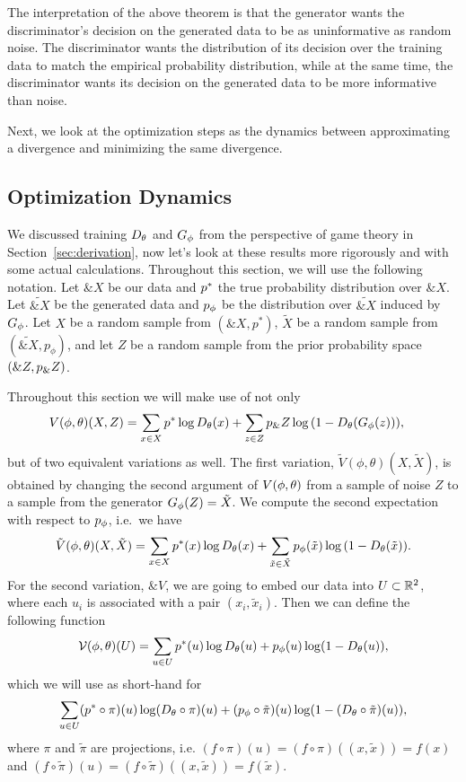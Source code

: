 The interpretation of the above theorem is that the generator wants
the discriminator's decision on the generated data to be as
uninformative as random noise.  The discriminator wants the
distribution of its decision over the training data to match the
empirical probability distribution, while at the same time, the
discriminator wants its decision on the generated data to be more
informative than noise.

Next, we look at the optimization steps as the dynamics between
approximating a divergence and minimizing the same divergence.

\subsection{Optimization Dynamics}%
\label{sec:optimization-dynamics}

We discussed training $D_\theta$ and $G_\phi$ from the perspective of game
theory in Section~\ref{sec:derivation}, now let's look at these
results more rigorously and with some actual calculations. Throughout
this section, we will use the following notation. Let $\&X$ be our
data and $p^*$ the true probability distribution over $\&X$. Let
$\tilde{\&X}$ be the generated data and $p_{\phi}$ be the distribution over
$\tilde{\&X}$ induced by $G_\phi$. Let $X$ be a random sample from
$(\&X, p^*)$, $\tilde{X}$ be a random sample from
$(\tilde{\&X}, p_\phi)$, and let $Z$ be a random sample from the prior
probability space $(\&Z, p_\&Z)$.

Throughout this section we will make use of not only
\begin{align} V(\phi, \theta)(X, Z) & = \sum_{x \in X}p^*\log{D_\theta(x)} +
  \sum_{z \in Z}p_\&Z\log{(1 - D_\theta(G_\phi(z)))},
\end{align}
but of two equivalent variations as well. The first variation,
$\tilde{V}(\phi, \theta)(X, \tilde{X})$, is obtained by changing the
second argument of $V(\phi, \theta)$ from a sample of noise $Z$ to a sample from
the generator $G_\phi(Z) = \tilde{X}$. We compute the second
expectation with respect to $p_{\phi}$, i.e.\ we have
\begin{align}
  \tilde{V}(\phi, \theta)(X, \tilde{X}) = \sum_{x \in X}p^*(x)\log{D_\theta(x)} + \sum_{\tilde{x} \in\tilde{X}}p_{\phi}(\tilde{x})\log{(1 - D_\theta(\tilde{x}))}.
\end{align}
For the second variation, $\&V$, we are going to embed our data into
$U \subset \mathbb{R}^2$, where each $u_i$ is associated with a pair
$(x_i, \tilde{x}_i)$. Then we can define the following function
\begin{align}
  \label{eq:joined}
  \mathcal{V}(\phi, \theta)(U) = \sum_{u \in U} p^*(u) \log D_\theta(u) + p_{\phi}(u) \log(1 - D_\theta(u)),
\end{align}
which we will use as short-hand for
\begin{align}
  \label{eq:joined-verbose}
  \sum_{u \in U} (p^* \circ \pi)(u)\log (D_\theta \circ \pi)(u) + (p_{\phi} \circ \tilde{\pi})(u) \log(1 - (D_\theta \circ \tilde{\pi})(u)),
\end{align}
where $\pi$ and $\tilde{\pi}$ are projections, i.e. $(f \circ \pi)(u) = (f
\circ \pi)((x, \tilde{x})) = f(x)$ and $(f \circ \tilde{\pi})(u) = (f
\circ \tilde{\pi})((x, \tilde{x})) = f(\tilde{x})$.

